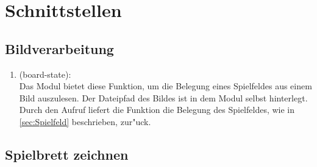 \documentclass[a4paper]{scrreprt}
\begin{document}
 \chapter{Schnittstellen}
 \section{Bildverarbeitung}
\begin{enumerate}
\item (board-state):\\
Das Modul bietet diese Funktion, um die Belegung eines Spielfeldes aus einem Bild auszulesen. Der Dateipfad des Bildes ist in dem Modul selbst hinterlegt. Durch den Aufruf liefert die Funktion die Belegung des Spielfeldes, wie in \ref{sec:Spielfeld} beschrieben, zur"uck.
\end{enumerate}

\section{Spielbrett zeichnen}
\end{document}
